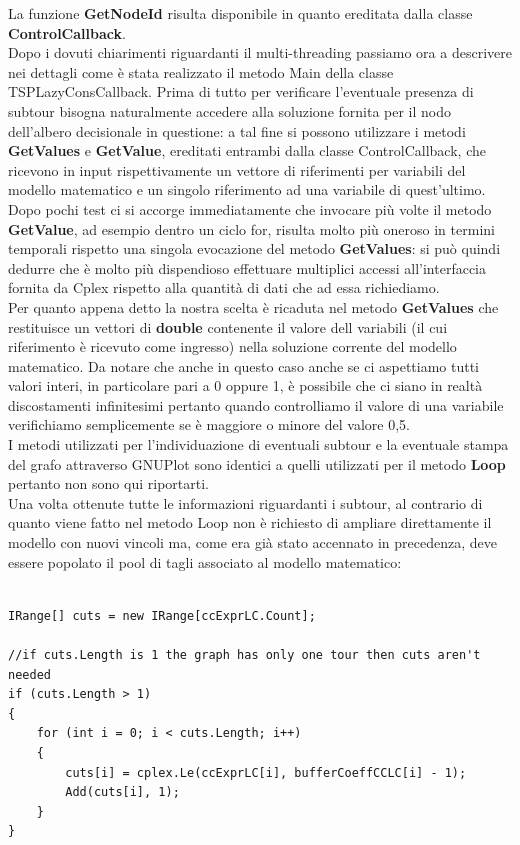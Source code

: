 \documentclass[11pt]{article}
\begin{document}
La funzione \textbf{GetNodeId} risulta disponibile in quanto ereditata dalla classe \textbf{ControlCallback}.\\
Dopo i dovuti chiarimenti riguardanti il multi-threading passiamo ora a descrivere nei dettagli come è stata realizzato il metodo Main della classe TSPLazyConsCallback. Prima di tutto per verificare l'eventuale presenza di subtour bisogna naturalmente accedere alla soluzione fornita per il nodo dell'albero decisionale in questione: a tal fine si possono utilizzare i metodi \textbf{GetValues} e \textbf{GetValue}, ereditati entrambi dalla classe ControlCallback, che ricevono in input rispettivamente un vettore di riferimenti per variabili del modello matematico e un singolo riferimento ad una variabile di quest'ultimo. Dopo pochi test ci si accorge immediatamente che invocare più volte il metodo \textbf{GetValue}, ad esempio dentro un ciclo for, risulta molto più oneroso in termini temporali rispetto una singola evocazione del metodo \textbf{GetValues}: si può quindi dedurre che è molto più dispendioso effettuare multiplici accessi all'interfaccia fornita da Cplex rispetto alla quantità di dati che ad essa richiediamo.\\
Per quanto appena detto la nostra scelta è ricaduta nel metodo \textbf{GetValues} che restituisce un vettori di \textbf{double} contenente il valore dell variabili (il cui riferimento è ricevuto come ingresso) nella soluzione corrente del modello matematico. Da notare che anche in questo caso anche se ci aspettiamo tutti valori interi, in particolare pari a 0 oppure 1, è possibile che ci siano in realtà discostamenti infinitesimi pertanto quando controlliamo il valore di una variabile verifichiamo semplicemente se è maggiore o minore del valore 0,5.\\
I metodi utilizzati per l'individuazione di eventuali subtour e la eventuale stampa del grafo attraverso GNUPlot sono identici a quelli utilizzati per il metodo \textbf{Loop} pertanto non sono qui riportarti.\\
Una volta ottenute tutte le informazioni riguardanti i subtour, al contrario di quanto viene fatto nel metodo Loop non è richiesto di ampliare direttamente il modello con nuovi vincoli ma, come era già stato accennato in precedenza, deve essere popolato il pool di tagli associato al modello matematico:

\begin{lstlisting}

IRange[] cuts = new IRange[ccExprLC.Count];

//if cuts.Length is 1 the graph has only one tour then cuts aren't needed
if (cuts.Length > 1)
{
    for (int i = 0; i < cuts.Length; i++)
    {
        cuts[i] = cplex.Le(ccExprLC[i], bufferCoeffCCLC[i] - 1);
        Add(cuts[i], 1);
    }
}

\end{lstlisting}
\end{document}
